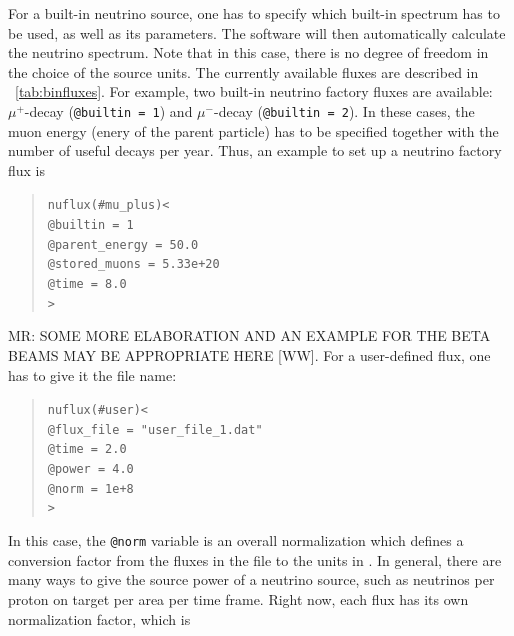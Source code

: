 For a built-in neutrino source, one has to specify which
built-in spectrum has to be used, as well as its parameters. The software
will then automatically calculate the neutrino spectrum. Note that in this
case, there is no degree of freedom in the choice of the source units.
The currently available fluxes are described in \Tab~\ref{tab:binfluxes}.
For example, two built-in neutrino factory fluxes are available: $\mu^+$-decay ({\tt @builtin = 1}) and $\mu^-$-decay ({\tt @builtin = 2}). In these cases, the muon energy (enery of the parent particle) has to be specified together with the number of useful decays  per year. Thus, an example to set up a neutrino factory flux is 
\begin{quote}
{\tt nuflux(\#mu\_plus)<\\
\tb  @builtin = 1\\
\tb  @parent\_energy = 50.0\\
\tb  @stored\_muons = 5.33e+20\\
\tb  @time = 8.0\\
>}
\end{quote}
MR: SOME MORE ELABORATION AND AN EXAMPLE FOR THE BETA BEAMS MAY BE APPROPRIATE HERE [WW].
%
For a user-defined flux, one has to give it the file name:
\begin{quote}
{\tt nuflux(\#user)<}\\
{\tt \tb @flux\_file = "user\_file\_1.dat"\\
\tb @time = 2.0\\
\tb @power = 4.0\\
\tb @norm = 1e+8}\\
{\tt >}
\end{quote}
In this case, the {\tt @norm} variable is an overall normalization which defines a conversion factor from the fluxes in the file to the units in \GLOBES . In general, there are many ways to give the source power of a 
neutrino source, such as neutrinos per proton on target per area per time frame. Right now, each flux has its own normalization factor, which is
